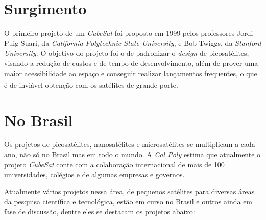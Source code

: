 \documentclass[
	12pt,				%
	openright,			%
	oneside,			%
	a4paper,			%
	english,			%
	french,				%
	spanish,			%
	brazil,				%
	oldfontcommands
	]{abntex2}
\begin{document}
\section[Surgimento]{Surgimento} 

	O primeiro projeto de um \textit{CubeSat} foi proposto em 1999 pelos professores Jordi Puig-Suari, da \textit{California Polytechnic State University}, e Bob Twiggs, da \textit{Stanford University}. O objetivo do projeto foi o de padronizar o \textit{design} de picosatélites, visando a redução de custos e de tempo de desenvolvimento, além de prover uma maior acessibilidade ao espaço e conseguir realizar lançamentos frequentes, o que é de inviável obtenção com os satélites de grande porte.\textsuperscript{\cite{CubeSat}}

\section[No Brasil]{No Brasil}

	Os projetos de picosatélites, nanosatélites e microsatélites se multiplicam a cada ano, não só no Brasil mas em todo o mundo. A \textit{Cal Poly} estima que atualmente o projeto \textit{CubeSat} conte com a colaboração internacional de mais de 100 universidades, colégios e de algumas empresas e governos.
	
	Atualmente vários projetos nessa área, de pequenos satélites para diversas áreas da pesquisa científica e tecnológica, estão em curso no Brasil e outros ainda em fase de discussão, dentre eles se destacam os projetos abaixo:
	
\end{document}

